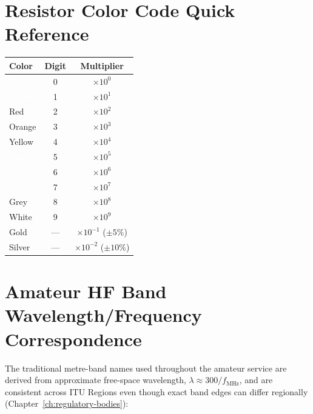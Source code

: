 \section*{Resistor Color Code Quick Reference}
\begin{center}
\renewcommand{\arraystretch}{1.1}
\begin{tabular}{@{}lc c@{}}
\toprule
Color & Digit & Multiplier \\
\midrule
\cellcolor{black!85}\textcolor{white}{Black} & 0 & $\times10^0$ \\
\cellcolor{brown!70!black}\textcolor{white}{Brown} & 1 & $\times10^1$ \\
\cellcolor{red}Red & 2 & $\times10^2$ \\
\cellcolor{orange}Orange & 3 & $\times10^3$ \\
\cellcolor{yellow}Yellow & 4 & $\times10^4$ \\
\cellcolor{green!70!black}\textcolor{white}{Green} & 5 & $\times10^5$ \\
\cellcolor{blue}\textcolor{white}{Blue} & 6 & $\times10^6$ \\
\cellcolor{violet}\textcolor{white}{Violet} & 7 & $\times10^7$ \\
\cellcolor{gray!60}Grey & 8 & $\times10^8$ \\
White & 9 & $\times10^9$ \\
\cellcolor{yellow!70!orange}Gold & --- & $\times10^{-1}$ ($\pm5\%$) \\
\cellcolor{gray!30}Silver & --- & $\times10^{-2}$ ($\pm10\%$) \\
\bottomrule
\end{tabular}
\end{center}

\section*{Amateur HF Band Wavelength/Frequency Correspondence}
\noindent The traditional metre-band names used throughout the amateur
service are derived from approximate free-space wavelength,
$\lambda \approx 300/f_{\text{MHz}}$, and are consistent across ITU
Regions even though exact band edges can differ regionally
(Chapter~\ref{ch:regulatory-bodies}):

